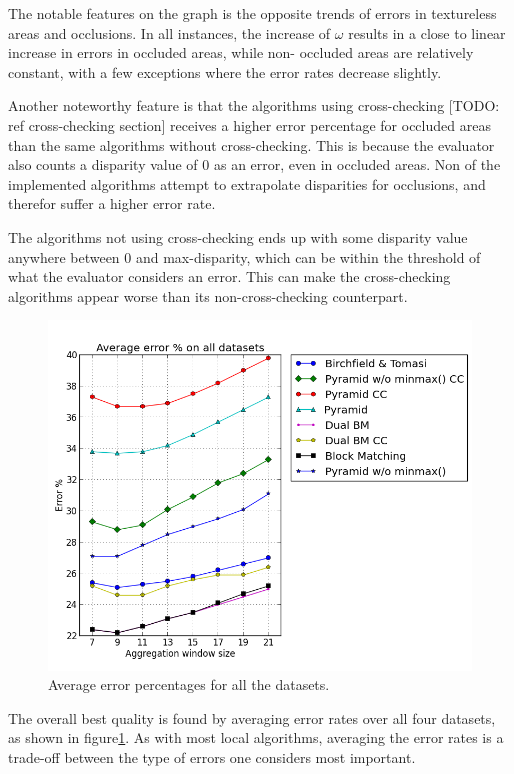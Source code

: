 The notable features on the graph is the opposite trends of errors in
textureless areas and occlusions. In all instances, the increase of $\omega$
results in a close to linear increase in errors in occluded areas, while non-
occluded areas are relatively constant, with a few exceptions where the error
rates decrease slightly.

Another noteworthy feature is that the algorithms using cross-checking [TODO:
ref cross-checking section] receives a higher error percentage for occluded
areas than the same algorithms without cross-checking. This is because the
evaluator also counts a disparity value of 0 as an error, even in occluded
areas. Non of the implemented algorithms attempt to extrapolate disparities
for occlusions, and therefor suffer a higher error rate.

The algorithms not using cross-checking ends up with some disparity value
anywhere between 0 and max-disparity, which can be within the threshold of
what the evaluator considers an error. This can make the cross-checking
algorithms appear worse than its non-cross-checking counterpart.

\begin{figure}
  \centering
  \includegraphics[width=\textwidth]{images/avg_error_all.png}
  \caption{Average error percentages for all the datasets. }
  \label{average-error-rates-final}
\end{figure}

The overall best quality is found by averaging error rates over all four
datasets, as shown in figure\ref{average-error-rates-final}. As with most
local algorithms, averaging the error rates is a trade-off between the type of
errors one considers most important.

